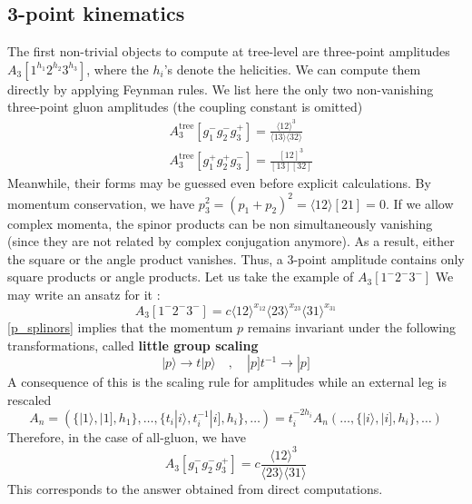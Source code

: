 \subsection*{3-point kinematics}
The first non-trivial objects to compute at tree-level are three-point amplitudes $A_3[1^{h_1}2^{h_2}3^{h_3}]$, where the $h_i$'s denote the helicities.
We can compute them directly by applying Feynman rules. 
We list here the only two non-vanishing three-point gluon amplitudes (the coupling constant is omitted)
\begin{equation*}
\begin{split}
& A^{\mathrm{tree}}_3[g_1^- g_2^- g_3^+] = \frac{\langle 12 \rangle^3}{\langle 13 \rangle \langle 32 \rangle}
\\
& A^{\mathrm{tree}}_3[g_1^+ g_2^+ g_3^-] = \frac{ [12]^3}{[13 ][ 32 ]}
\end{split}
\end{equation*}
Meanwhile, their forms may be guessed even before explicit calculations.  
By momentum conservation, we have $p_3^2 = (p_1 + p_2)^2 = \langle 12\rangle[21] = 0$. 
If we allow complex momenta, the spinor products can be non simultaneously vanishing (since they are not related by complex conjugation anymore). 
As a result, either the square or the angle product vanishes.
Thus, a 3-point amplitude contains only square products or angle products. 
Let us take the example of $A_3[1^{-}2^{-}3^{-}]$
We may write an ansatz for it :
\begin{equation*}
A_3[1^{-}2^{-}3^{-}] = c\langle 12 \rangle^{x_{12}}\langle 23 \rangle^{x_{23}}\langle 31 \rangle^{x_{31}}
\end{equation*}
\cref{p_splinors} implies that the momentum $p$ remains invariant under the following transformations, called \textbf{little group scaling}
\begin{equation*}
|p\rangle \rightarrow t| p\rangle \quad,\quad 
|p] t^{-1}\rightarrow |p]
\end{equation*} 
A consequence of this is the scaling rule for amplitudes while an external leg is rescaled
\begin{equation*}
A_n = (\{ |1\rangle, |1], h_1\},\ldots,\{t_i|i\rangle, t_i^{-1}|i], h_i\},\ldots) = 
t_i^{-2h_i}A_n(\ldots, \{|i\rangle,|i], h_i\},\ldots)
\end{equation*}
Therefore, in the case of all-gluon, we have
\begin{equation*}
A_3[g_1^-g_2^-g_3^+] = c\frac{\langle 12\rangle^3}{\langle 23 \rangle\langle 31\rangle}
\end{equation*}
This corresponds to the answer obtained from direct computations.
%
%
